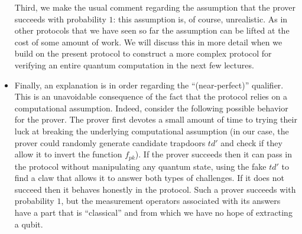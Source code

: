 \begin{itemize}
Third, we make the usual comment regarding the assumption that the prover succeeds with probability $1$: this assumption is, of course, unrealistic. As in other protocols that we have seen so far the assumption can be lifted at the cost of some amount of work. We will discuss this in more detail when we build on the present protocol to construct a more complex protocol for verifying an entire quantum computation in the next few lectures. 
\item
Finally, an explanation is in order regarding the ``(near-perfect)'' qualifier. This is an unavoidable consequence of the fact that the protocol relies on a computational assumption. Indeed, consider the following possible behavior for the prover. The prover first devotes a small amount of time to trying their luck at breaking the underlying computational assumption (in our case, the prover could randomly generate candidate trapdoors $td'$ and check if they allow it to invert the function $f_{pk}$). If the prover succeeds then it can pass in the protocol without manipulating any quantum state, using the fake $td'$ to find a claw that allows it to answer both types of challenges. If it does not succeed then it behaves honestly in the protocol. Such a prover succeeds with probability $1$, but the measurement operators associated with its answers have a part that is ``classical'' and from which we have no hope of extracting a qubit. 
\end{itemize}

